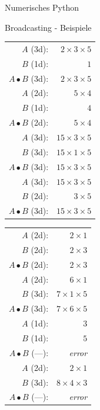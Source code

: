 \documentclass[utf8, smaller, c]{beamer}
\begin{document}
\begin{frame}{Numerisches Python}
	\begin{block}{Broadcasting - Beispiele}
		\hspace{5mm}
		\begin{minipage}{0.4\textwidth}
			\begin{tabular}{|rr|} \hline
			$A$ (3d): & $2\times 3\times 5$ \\
			$B$ (1d): & $1$ \\
			$A\bullet B$ (3d): & $2\times 3\times 5$ \\ \hline
			$A$ (2d): & $5\times 4$ \\
			$B$ (1d): & $4$ \\
			$A\bullet B$ (2d): & $5\times 4$ \\ \hline
			$A$ (3d): & $15\times 3\times 5$ \\
			$B$ (3d): & $15\times 1\times 5$ \\
			$A\bullet B$ (3d): & $15\times 3\times 5$ \\ \hline
			$A$ (3d): & $15\times 3\times 5$ \\
			$B$ (2d): & $3\times 5$ \\
			$A\bullet B$ (3d): & $15\times 3\times 5$ \\ \hline
			\end{tabular}
		\end{minipage}
		\hspace{5mm}
		\begin{minipage}{0.4\textwidth}
			\begin{tabular}{|rr|} \hline
			$A$ (2d): & $2\times 1$ \\
			$B$ (2d): & $2\times 3$ \\
			$A\bullet B$ (2d): & $2\times 3$ \\ \hline
			$A$ (2d): & $6\times 1$ \\
			$B$ (3d): & $7\times 1\times 5$ \\
			$A\bullet B$ (3d): & $7\times 6\times 5$ \\ \hline
			$A$ (1d): & $3$ \\
			$B$ (1d): & $5$ \\
			$A\bullet B$ (---): & \textit{error} \\ \hline
			$A$ (2d): & $2\times 1$ \\
			$B$ (3d): & $8\times 4\times 3$ \\
			$A\bullet B$ (---): & \textit{error} \\ \hline
			\end{tabular}
		\end{minipage}
	\end{block}
\end{frame}
\end{document}
